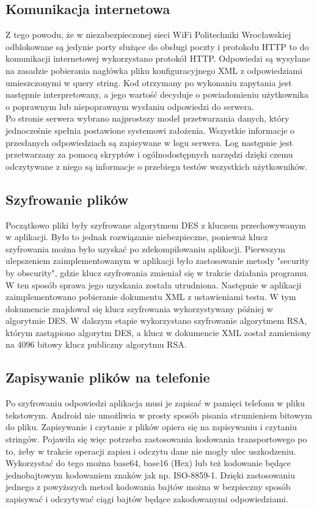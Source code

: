 \documentclass[eng]{mgr}
\begin{document}
			\subsection{Komunikacja internetowa}
			
			Z tego powodu, że w niezabezpieczonej sieci WiFi Politechniki Wrocławskiej odblokowane są jedynie porty służące do obsługi poczty i protokołu HTTP to do komunikacji internetowej wykorzystano protokół HTTP. Odpowiedzi są wysyłane na zasadzie pobierania nagłówka pliku konfiguracyjnego XML z odpowiedziami umieszczonymi w query string. Kod otrzymany po wykonaniu zapytania jest następnie interpretowany, a jego wartość decyduje o powiadomieniu użytkownika o poprawnym lub niepoprawnym wysłaniu odpowiedzi do serwera.\\
			
			Po stronie serwera wybrano najprostszy model przetwarzania danych, który jednocześnie spełnia postawione systemowi założenia. Wszystkie informacje o przesłanych odpowiedziach są zapisywane w logu serwera. Log następnie jest przetwarzany za pomocą skryptów i ogólnodostępnych narzędzi dzięki czemu odczytywane z niego są informacje o przebiegu testów wszystkich użytkowników.
		
			\subsection{Szyfrowanie plików}
		
			Początkowo pliki były szyfrowane algorytmem DES z kluczem przechowywanym w aplikacji. Było to jednak rozwiązanie niebezpieczne, ponieważ klucz szyfrowania można było uzyskać po zdekompilowaniu aplikacji. Pierwszym ulepszeniem zaimplementowanym w aplikacji było zastosowanie metody "security by obscurity", gdzie klucz szyfrowania zmieniał się w trakcie działania programu. W ten sposób sprawa jego uzyskania została utrudniona. Następnie w aplikacji zaimplementowano pobieranie dokumentu XML z ustawieniami testu. W tym dokumencie znajdował się klucz szyfrowania wykorzystywany później w algorytmie DES. W dalszym etapie wykorzystano szyfrowanie algorytmem RSA, którym zastąpiono algorytm DES, a klucz w dokumencie XML został zamieniony na 4096 bitowy klucz publiczny algorytmu RSA.
			
			\subsection{Zapisywanie plików na telefonie}
			
			Po szyfrowaniu odpowiedzi aplikacja musi je zapisać w pamięci telefonu w pliku tekstowym. Android nie umożliwia w prosty sposób pisania strumieniem bitowym do pliku. Zapisywanie i czytanie z plików opiera się na zapisywaniu i czytaniu stringów. Pojawiła się więc potrzeba zastosowania kodowania transportowego po to, żeby w trakcie operacji zapisu i odczytu dane nie mogły ulec uszkodzeniu. Wykorzystać do tego można base64, base16 (Hex) lub też kodowanie będące jednobajtowym kodowaniem znaków jak np. ISO-8859-1. Dzięki zastosowaniu jednego z powyższych metod kodowania bajtów można w bezpieczny sposób zapisywać i odczytywać ciągi bajtów będące zakodowanymi odpowiedziami.
		
\end{document}
